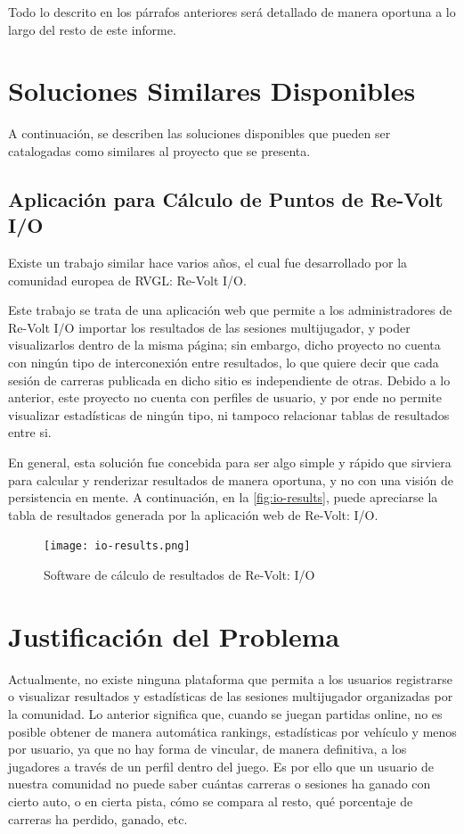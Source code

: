 Todo lo descrito en los párrafos anteriores será detallado de manera oportuna a lo largo del resto de este informe.

\section{Soluciones Similares Disponibles}
A continuación, se describen las soluciones disponibles que pueden ser catalogadas como similares al proyecto que se presenta.

\subsection{Aplicación para Cálculo de Puntos de Re-Volt I/O}
Existe un trabajo similar hace varios años, el cual fue desarrollado por la comunidad europea de RVGL: Re-Volt I/O.

Este trabajo se trata de una aplicación web que permite a los administradores de Re-Volt I/O importar los resultados de las sesiones multijugador, y poder visualizarlos dentro de la misma página; sin embargo, dicho proyecto no cuenta con ningún tipo de interconexión entre resultados, lo que quiere decir que cada sesión de carreras publicada en dicho sitio es independiente de otras. Debido a lo anterior, este proyecto no cuenta con perfiles de usuario, y por ende no permite visualizar estadísticas de ningún tipo, ni tampoco relacionar tablas de resultados entre si.

En general, esta solución fue concebida para ser algo simple y rápido que sirviera para calcular y renderizar resultados de manera oportuna, y no con una visión de persistencia en mente. A continuación, en la \autoref{fig:io-results}, puede apreciarse la tabla de resultados generada por la aplicación web de Re-Volt: I/O.

\begin{figure}[H]
  \begin{center}
    \texttt{[image: io-results.png]}
  \end{center}
  \caption[Software de cálculo de resultados de Re-Volt: I/O]{Software de cálculo de resultados de Re-Volt: I/O}
  \label{fig:io-results}
\end{figure}

\section{Justificación del Problema}
Actualmente, no existe ninguna plataforma que permita a los usuarios registrarse o visualizar resultados y estadísticas de las sesiones multijugador organizadas por la comunidad. Lo anterior significa que, cuando se juegan partidas online, no es posible obtener de manera automática rankings, estadísticas por vehículo y menos por usuario, ya que no hay forma de vincular, de manera definitiva, a los jugadores a través de un perfil dentro del juego. Es por ello que un usuario de nuestra comunidad no puede saber cuántas carreras o sesiones ha ganado con cierto auto, o en cierta pista, cómo se compara al resto, qué porcentaje de carreras ha perdido, ganado, etc.

